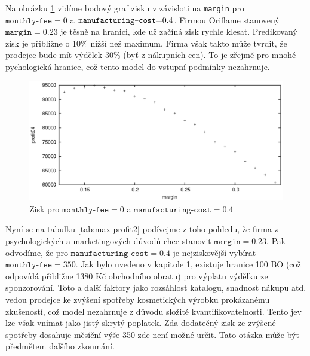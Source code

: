 \documentclass[a4wide,12pt]{report}
\begin{document}
Na obrázku \ref{fig:max-profit-04-f0} vidíme bodový graf zisku v závisloti na \texttt{margin} pro $\texttt{monthly-fee}=0$ a $\mbox{\texttt{manufacturing-cost}=0.4}$. Firmou Oriflame stanovený $\texttt{margin}=0.23$ je těsně na hranici, kde už začíná zisk rychle klesat. Predikovaný zisk je přibližne o 10\% nižší než maximum. Firma však takto může tvrdit, že prodejce bude mít výdělek 30\% (byť z nákupních cen). To je zřejmě pro mnohé pychologická hranice, což tento model do vstupní podmínky nezahrnuje.
\begin{figure}[h]
  \centering
  \includegraphics{max-profit-04-f0.eps}
  \caption{Zisk pro $\texttt{monthly-fee}=0$ a $\texttt{manufacturing-cost}=0.4$}
  \label{fig:max-profit-04-f0}
\end{figure}

Nyní se na tabulku \ref{tab:max-profit2} podívejme z toho pohledu, že firma z psychologických a marketingových důvodů chce stanovit $\texttt{margin}=0.23$. Pak odvodíme, že pro \mbox{$\texttt{manufacturing-cost}=0.4$} je nejziskovější vybírat $\texttt{monthly-fee}=350$. Jak bylo uvedeno v kapitole 1, existuje hranice 100 BO (což odpovídá přibližne 1380 Kč obchodního obratu) pro výplatu výdělku ze sponzorování. Toto a další faktory jako rozsáhlost katalogu, snadnost nákupu atd. vedou prodejce ke zvýšení spotřeby kosmetických výrobku prokázanému zkušeností, což model nezahrnuje z důvodu složité kvantifikovatelnosti. Tento jev lze však vnímat jako jistý skrytý poplatek. Zda dodatečný zisk ze zvýšené spotřeby dosahuje měsíční výše 350 zde není možné určit. Tato otázka může být předmětem dalšího zkoumání.
\end{document}
